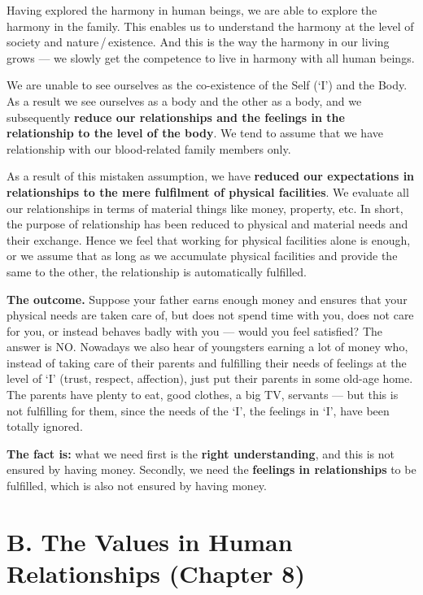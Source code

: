 Having explored the harmony in human beings, we are able to explore the
harmony in the family. This enables us to understand the harmony at the level
of society and nature\,/\,existence. And this is the way the harmony in our
living grows --- we slowly get the competence to live in harmony with all
human beings.


\ans We are unable to see ourselves as the co-existence of the Self (`I') and
the Body. As a result we see ourselves as a body and the other as a body, and
we subsequently \textbf{reduce our relationships and the feelings in the
relationship to the level of the body}. We tend to assume that we have
relationship with our blood-related family members only.

As a result of this mistaken assumption, we have \textbf{reduced our
expectations in relationships to the mere fulfilment of physical facilities}.
We evaluate all our relationships in terms of material things like money,
property, etc. In short, the purpose of relationship has been reduced to
physical and material needs and their exchange. Hence we feel that working for
physical facilities alone is enough, or we assume that as long as we
accumulate physical facilities and provide the same to the other, the
relationship is automatically fulfilled.

\textbf{The outcome.} Suppose your father earns enough money and ensures that
your physical needs are taken care of, but does not spend time with you, does
not care for you, or instead behaves badly with you --- would you feel
satisfied? The answer is NO. Nowadays we also hear of youngsters earning a lot
of money who, instead of taking care of their parents and fulfilling their
needs of feelings at the level of `I' (trust, respect, affection), just put
their parents in some old-age home. The parents have plenty to eat, good
clothes, a big TV, servants --- but this is not fulfilling for them, since the
needs of the `I', the feelings in `I', have been totally ignored.

\textbf{The fact is:} what we need first is the \textbf{right understanding},
and this is not ensured by having money. Secondly, we need the \textbf{feelings
in relationships} to be fulfilled, which is also not ensured by having money.

\section{B. The Values in Human Relationships (Chapter 8)}

